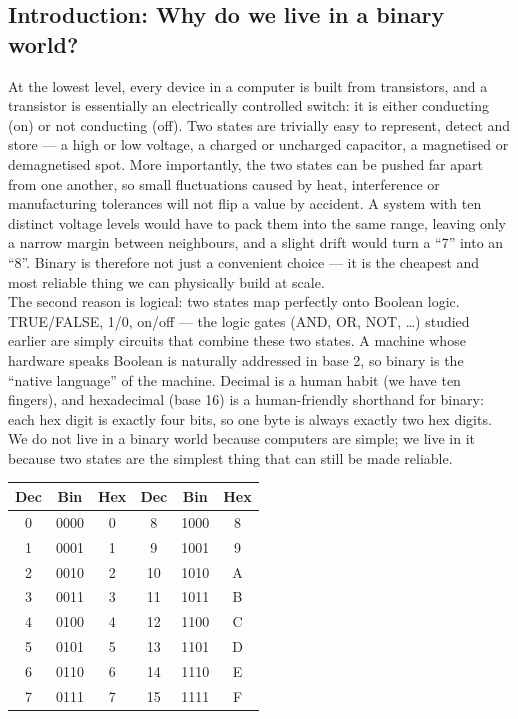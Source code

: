 \documentclass[a4paper,12pt]{article}
\begin{document}
\subsection{Introduction: Why do we live in a binary world?}
At the lowest level, every device in a computer is built from transistors, and a transistor is essentially an electrically controlled switch: it is either conducting (on) or not conducting (off). Two states are trivially easy to represent, detect and store --- a high or low voltage, a charged or uncharged capacitor, a magnetised or demagnetised spot. More importantly, the two states can be pushed far apart from one another, so small fluctuations caused by heat, interference or manufacturing tolerances will not flip a value by accident. A system with ten distinct voltage levels would have to pack them into the same range, leaving only a narrow margin between neighbours, and a slight drift would turn a ``7'' into an ``8''. Binary is therefore not just a convenient choice --- it is the cheapest and most reliable thing we can physically build at scale.\\
The second reason is logical: two states map perfectly onto Boolean logic. TRUE/FALSE, 1/0, on/off --- the logic gates (AND, OR, NOT, \dots) studied earlier are simply circuits that combine these two states. A machine whose hardware speaks Boolean is naturally addressed in base 2, so binary is the ``native language'' of the machine. Decimal is a human habit (we have ten fingers), and hexadecimal (base 16) is a human-friendly shorthand for binary: each hex digit is exactly four bits, so one byte is always exactly two hex digits. We do not live in a binary world because computers are simple; we live in it because two states are the simplest thing that can still be made reliable.
\begin{center}
\renewcommand{\arraystretch}{1.2}
\begin{tabular}{|c|c|c||c|c|c|}
\hline
\textbf{Dec} & \textbf{Bin} & \textbf{Hex} & \textbf{Dec} & \textbf{Bin} & \textbf{Hex} \\
\hline
0 & 0000 & 0 & 8 & 1000 & 8 \\
1 & 0001 & 1 & 9 & 1001 & 9 \\
2 & 0010 & 2 & 10 & 1010 & A \\
3 & 0011 & 3 & 11 & 1011 & B \\
4 & 0100 & 4 & 12 & 1100 & C \\
5 & 0101 & 5 & 13 & 1101 & D \\
6 & 0110 & 6 & 14 & 1110 & E \\
7 & 0111 & 7 & 15 & 1111 & F \\
\hline
\end{tabular}
\end{center}
\end{document}
